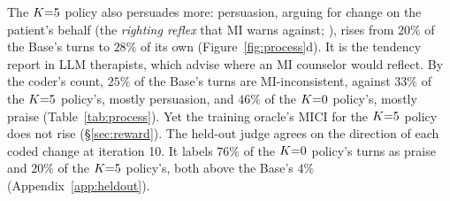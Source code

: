 The $K{=}5$ policy also persuades more: persuasion, arguing for change on the patient's behalf (the
\emph{righting reflex} that MI warns against; \citealp{miller2013mi}), rises from $20\%$ of the
Base's turns to $28\%$ of its own (Figure~\ref{fig:process}d).
It is the tendency \citet{chiu2024bolt} report in LLM therapists, which advise where an MI
counselor would reflect.
By the coder's count, $25\%$ of the Base's turns are MI-inconsistent, against $33\%$ of the $K{=}5$
policy's, mostly persuasion, and $46\%$ of the $K{=}0$ policy's, mostly praise (Table~\ref{tab:process}).
Yet the training oracle's MICI for the $K{=}5$ policy does not rise (\S\ref{sec:reward}). The held-out
judge agrees on the direction of each coded change at iteration 10. It labels $76\%$ of the $K{=}0$
policy's turns as praise and $20\%$ of the $K{=}5$ policy's, both above the Base's $4\%$
(Appendix~\ref{app:heldout}).

